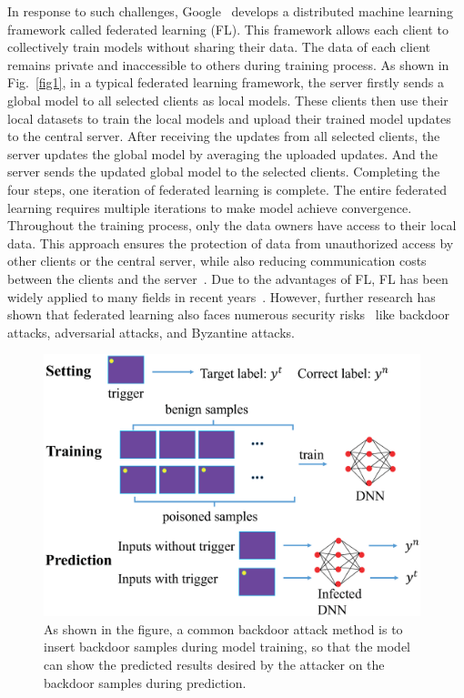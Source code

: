 \documentclass[pdflatex,sn-mathphys-num]{sn-jnl}%
\theoremstyle{thmstyleone}%
\theoremstyle{thmstyletwo}%
\theoremstyle{thmstylethree}%
\begin{document}
In response to such challenges, Google~\cite{mcmahan2017communication} develops a
distributed machine learning framework called federated
learning (FL). This framework allows each client to collectively train models without sharing their data. The data
of each client remains private and inaccessible to others
during training process. As shown in Fig.~\ref{fig1}, in a typical federated learning framework, the server firstly sends a global
model to all selected clients as local models. These clients
then use their local datasets to train the local models and
upload their trained model updates to the central server.
After receiving the updates from all selected clients, the
server updates the global model by averaging the uploaded
updates. And the server sends the updated global model
to the selected clients. Completing the four steps, one iteration
of federated learning is complete. The entire federated
learning requires multiple iterations to make model achieve
convergence. Throughout the training process, only the
data owners have access to their local data. This approach
ensures the protection of data from unauthorized access
by other clients or the central server, while also reducing
communication costs between the clients and the server~\cite{yang2019federated}. Due to the advantages of FL, FL has been widely
applied to many fields in recent years~\cite{doshi2022federated,becking2022adaptive,chen2019federated,lin2021fednlp,Liu_Yu,Wu_Wu_Cao_Huang_Xie_2021}.
However,
further research has shown that federated learning also
faces numerous security risks~\cite{guo2021robust,enthoven2021overview,rodriguez2023survey,tariq2023trustworthy,zhang2023survey} like backdoor
attacks, adversarial attacks, and Byzantine attacks.  

\begin{figure}[t]
	\centering
	\includegraphics[width=1.0\linewidth,height=3in]{output/fig2.eps}
	\caption{As shown in the figure, a common backdoor attack method
		is to insert backdoor samples during model training, so that the
		model can show the predicted results desired by the attacker on the
		backdoor samples during prediction.}
	\label{fig2}
\end{figure}
\end{document}
